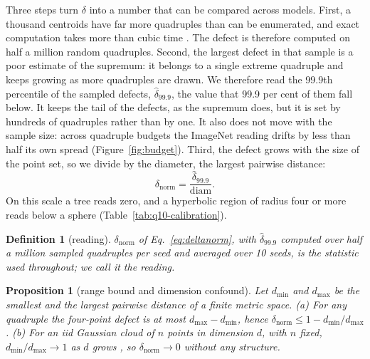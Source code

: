 \documentclass{article}
\theoremstyle{inline}
\newtheorem{definition}{Definition}
\theoremstyle{inlineit}
\newtheorem{proposition}{Proposition}
\begin{document}
Three steps turn $\delta$ into a number that can be compared across models. First, a thousand centroids have far more quadruples than can be enumerated, and exact computation takes more than cubic time \citep{fournier2015computing}. The defect is therefore computed on half a million random quadruples. Second, the largest defect in that sample is a poor estimate of the supremum: it belongs to a single extreme quadruple and keeps growing as more quadruples are drawn. We therefore read the 99.9th percentile of the sampled defects, $\hat\delta_{99.9}$, the value that 99.9 per cent of them fall below. It keeps the tail of the defects, as the supremum does, but it is set by hundreds of quadruples rather than by one. It also does not move with the sample size: across quadruple budgets the ImageNet reading drifts by less than half its own spread (Figure~\ref{fig:budget}). Third, the defect grows with the size of the point set, so we divide by the diameter, the largest pairwise distance:
\begin{equation}
\delta_{\text{norm}}=\frac{\hat\delta_{99.9}}{\mathrm{diam}}.
\label{eq:deltanorm}
\end{equation}
On this scale a tree reads zero, and a hyperbolic region of radius four or more reads below a sphere (Table~\ref{tab:q10-calibration}).

\begin{defbox}
\begin{definition}[reading]
\label{def:reading}
$\delta_{\text{norm}}$ of Eq.~\ref{eq:deltanorm}, with $\hat\delta_{99.9}$ computed over half a million sampled quadruples per seed and averaged over 10 seeds, is the statistic used throughout; we call it the reading.
\end{definition}
\end{defbox}

\begin{propbox}
\begin{proposition}[range bound and dimension confound]
\label{prop:bound}
Let $d_{\min}$ and $d_{\max}$ be the smallest and the largest pairwise distance of a finite metric space. (a) For any quadruple the four-point defect is at most $d_{\max}-d_{\min}$, hence $\delta_{\text{norm}}\le 1-d_{\min}/d_{\max}$. (b) For an iid Gaussian cloud of $n$ points in dimension $d$, with $n$ fixed, $d_{\min}/d_{\max}\to1$ as $d$ grows \citep{beyer1999nearest, aggarwal2001surprising}, so $\delta_{\text{norm}}\to0$ without any structure.
\end{proposition}
\end{propbox}
\end{document}
